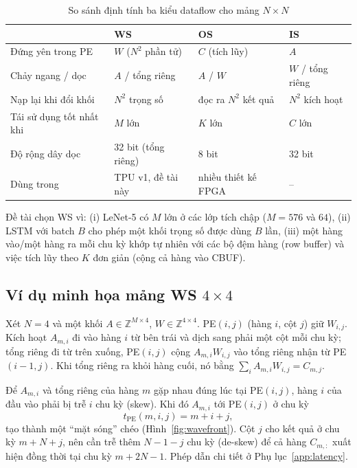 \begin{table}[H]
  \centering
  \caption{So sánh định tính ba kiểu dataflow cho mảng $N\times N$}
  \label{tab:dataflow}
  \begin{tabularx}{\linewidth}{lXXX}
    \toprule
     & WS & OS & IS \\
    \midrule
    Đứng yên trong PE & $W$ ($N^2$ phần tử) & $C$ (tích lũy) & $A$ \\
    Chảy ngang / dọc & $A$ / tổng riêng & $A$ / $W$ & $W$ / tổng riêng \\
    Nạp lại khi đổi khối & $N^2$ trọng số & đọc ra $N^2$ kết quả & $N^2$ kích hoạt \\
    Tái sử dụng tốt nhất khi & $M$ lớn & $K$ lớn & $C$ lớn \\
    Độ rộng dây dọc & 32 bit (tổng riêng) & 8 bit & 32 bit \\
    Dùng trong & TPU v1, đề tài này & nhiều thiết kế FPGA & -- \\
    \bottomrule
  \end{tabularx}
\end{table}

Đề tài chọn WS vì: (i) LeNet-5 có $M$ lớn ở các lớp tích chập ($M=576$ và $64$), (ii) LSTM với batch $B$ cho phép một khối trọng số được dùng $B$ lần, (iii) một hàng vào/một hàng ra mỗi chu kỳ khớp tự nhiên với các bộ đệm hàng (row buffer) và việc tích lũy theo $K$ đơn giản (cộng cả hàng vào CBUF).

\subsection{Ví dụ minh họa mảng WS \texorpdfstring{$4\times4$}{4 x 4}}
\label{sec:ws-example}
Xét $N=4$ và một khối $A\in\mathbb{Z}^{M\times4}$, $W\in\mathbb{Z}^{4\times4}$. PE$(i,j)$ (hàng $i$, cột $j$) giữ $W_{i,j}$. Kích hoạt $A_{m,i}$ đi vào hàng $i$ từ bên trái và dịch sang phải một cột mỗi chu kỳ; tổng riêng đi từ trên xuống, PE$(i,j)$ cộng $A_{m,i}W_{i,j}$ vào tổng riêng nhận từ PE$(i-1,j)$. Khi tổng riêng ra khỏi hàng cuối, nó bằng $\sum_{i}A_{m,i}W_{i,j}=C_{m,j}$.

Để $A_{m,i}$ và tổng riêng của hàng $m$ gặp nhau đúng lúc tại PE$(i,j)$, hàng $i$ của đầu vào phải bị trễ $i$ chu kỳ (skew). Khi đó $A_{m,i}$ tới PE$(i,j)$ ở chu kỳ
\begin{equation}
  t_{\mathrm{PE}}(m,i,j) = m + i + j,
  \label{eq:wavefront}
\end{equation}
tạo thành một ``mặt sóng'' chéo (Hình~\ref{fig:wavefront}). Cột $j$ cho kết quả ở chu kỳ $m+N+j$, nên cần trễ thêm $N-1-j$ chu kỳ (de-skew) để cả hàng $C_{m,:}$ xuất hiện đồng thời tại chu kỳ $m+2N-1$. Phép dẫn chi tiết ở Phụ lục~\ref{app:latency}.


